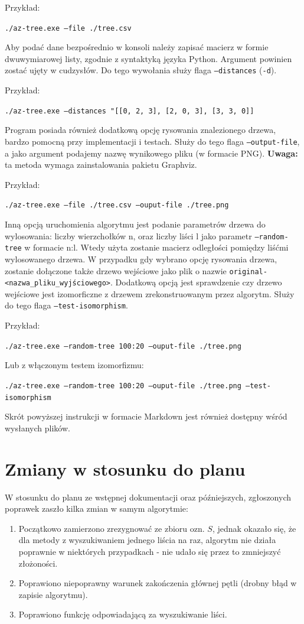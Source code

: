 \documentclass[a4paper,12p]{article}
\begin{document}
Przykład:

\texttt{./az-tree.exe --file ./tree.csv}

Aby podać dane bezpośrednio w konsoli należy zapisać macierz w formie dwuwymiarowej listy, zgodnie z syntaktyką języka Python. Argument powinien zostać ujęty w cudzysłów. Do tego wywołania służy flaga \texttt{--distances} (\texttt{-d}).

Przykład:

\texttt{./az-tree.exe --distances "[[0, 2, 3], [2, 0, 3], [3, 3, 0]]}

Program posiada również dodatkową opcję rysowania znalezionego drzewa, bardzo pomocną przy implementacji i testach. Służy do tego flaga \texttt{--output-file}, a jako argument podajemy nazwę wynikowego pliku (w formacie PNG). \textbf{Uwaga:} ta metoda wymaga zainstalowania pakietu Graphviz.

Przykład:

\texttt{./az-tree.exe --file ./tree.csv --ouput-file ./tree.png}

Inną opcją uruchomienia algorytmu jest podanie parametrów drzewa do wylosowania: liczby wierzchołków n, oraz liczby liści l jako parametr \texttt{--random-tree} w formacie n:l. Wtedy użyta zostanie macierz odległości pomiędzy liśćmi wylosowanego drzewa. 
W przypadku gdy wybrano opcję rysowania drzewa, zostanie dołączone także drzewo wejściowe jako plik o nazwie \verb$original-<nazwa_pliku_wyjściowego>$. 
Dodatkową opcją jest sprawdzenie czy drzewo wejściowe jest izomorficzne z drzewem zrekonstruowanym przez algorytm. Służy do tego flaga \texttt{--test-isomorphism}.

Przykład:

\texttt{./az-tree.exe --random-tree 100:20 --ouput-file ./tree.png}

Lub z włączonym testem izomorfizmu:

\texttt{./az-tree.exe --random-tree 100:20 --ouput-file ./tree.png --test-isomorphism}

Skrót powyższej instrukcji w formacie Markdown jest również dostępny wśród wysłanych plików.

\section{Zmiany w stosunku do planu}

W stosunku do planu ze wstępnej dokumentacji oraz późniejszych, zgłoszonych poprawek zaszło kilka zmian w samym algorytmie:

\begin{enumerate}
	\item Początkowo zamierzono zrezygnować ze zbioru ozn. $S$, jednak okazało się, że dla metody z wyszukiwaniem jednego liścia na raz, algorytm nie działa poprawnie w niektórych przypadkach - nie udało się przez to zmniejszyć złożoności.
	\item Poprawiono niepoprawny warunek zakończenia głównej pętli (drobny błąd w zapisie algorytmu).
	\item Poprawiono funkcję odpowiadającą za wyszukiwanie liści.
\end{enumerate}
\end{document}
